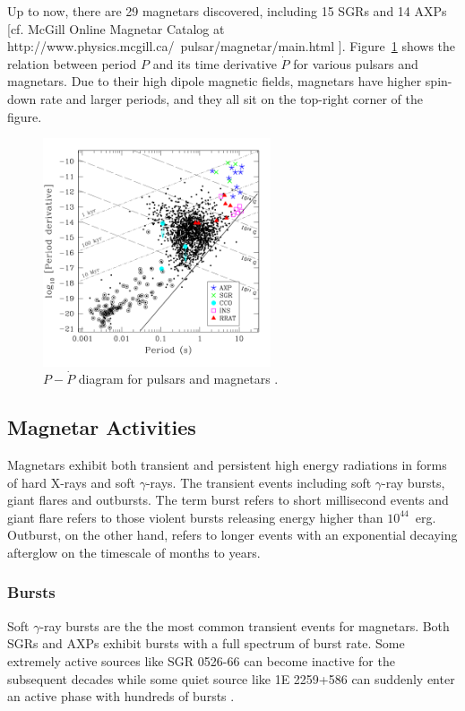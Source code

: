 Up to now, there are 29 magnetars discovered, including 15 SGRs and 14 AXPs [cf. McGill Online Magnetar Catalog at http://www.physics.mcgill.ca/~pulsar/magnetar/main.html \citep{2014ApJS..212....6O}].
Figure~\ref{fig:ppdot} shows the relation between period $P$ and its time derivative $\dot{P}$ for various pulsars and magnetars.
Due to their high dipole magnetic fields, magnetars have higher spin-down rate and larger periods, and they all sit on the top-right corner of the figure.
%
\begin{figure}[h]
  \centering
  \includegraphics[width=0.6\textwidth]{pics/intro/ppdot.png}
  \caption[$P-\dot{P}$ diagram for pulsars and magnetars]{$P-\dot{P}$ diagram for pulsars and magnetars \citep{2010PNAS..107.7147K}.}
  \label{fig:ppdot}
\end{figure}
%
\subsection{Magnetar Activities}
\label{sec:magnetar-activities}

Magnetars exhibit both transient and persistent high energy radiations in forms of hard X-rays and soft $\gamma$-rays.
The transient events including soft $\gamma$-ray bursts, giant flares and outbursts.
The term burst refers to short millisecond events and giant flare refers to those violent bursts releasing energy higher than $10^{44}$~erg.
Outburst, on the other hand, refers to longer events with an exponential decaying afterglow on the timescale of months to years.

\subsubsection{Bursts}
Soft $\gamma$-ray bursts are the the most common transient events for magnetars. Both SGRs and AXPs exhibit bursts with a full spectrum of burst rate.
Some extremely active sources like SGR 0526-66 can become inactive for the subsequent decades \citep{2003ApJ...585..948K,2009MNRAS.399L..74T} while some quiet source like 1E 2259+586 can suddenly enter an active phase with hundreds of bursts  \citep{2003ApJ...588L..93K}.

